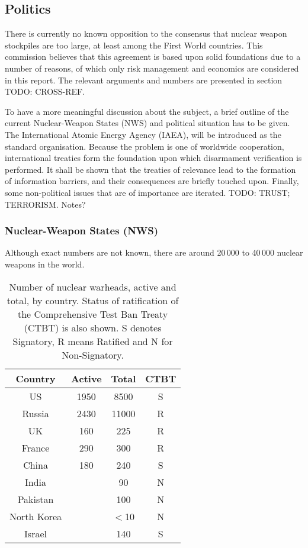 \documentclass[twoside,titlepage,11pt,twocolumn,a4paper]{article}
\begin{document}
\subsection{Politics}
There is currently no known opposition to the consensus that nuclear
weapon stockpiles are too large, at least among the First World
countries. This commission believes that this agreement is based upon
solid foundations due to a number of reasons, of which only risk
management and economics are considered in this report. The relevant
arguments and numbers are presented in section TODO: CROSS-REF. 

To have a more meaningful discussion about the subject, a brief
outline of the current Nuclear-Weapon States (NWS) and political
situation has to be given. The International Atomic Energy Agency
(IAEA), will be introduced as the standard organisation. Because the
problem is one of worldwide cooperation, international treaties form
the foundation upon which disarmament verification is performed. It
shall be shown that the treaties of relevance lead to the formation of
information barriers, and their consequences are briefly touched
upon. Finally, some non-political issues that are of importance are
iterated. TODO: TRUST; TERRORISM. Notes?

\subsubsection{Nuclear-Weapon States (NWS)}
Although exact numbers are not known, there are around 20\,000 to
40\,000 nuclear weapons in the world. \citep{worldNuclearForces2011,
  norris2010}

\begin{table}
  \begin{tabular}{|c|c|c|c|}
    \hline
    Country	& Active& Total		& CTBT	\\
    \hline
    US		& 1950 	& 8500		& S	\\
    Russia	& 2430 	& 11000		& R	\\
    UK		& 160 	& 225		& R	\\
    France	& 290	& 300		& R	\\
    China	& 180	& 240		& S	\\
    India	&	& 90		& N	\\
    Pakistan	&	& 100		& N	\\
    North Korea	&	& \(<\)10	& N	\\
    Israel	&	& 140		& S	\\
    \hline
  \end{tabular}
  \caption{Number of nuclear warheads, active and total, by
    country. Status of ratification of the Comprehensive Test Ban
    Treaty (CTBT) is also shown. S denotes Signatory, R means Ratified
    and N for Non-Signatory. \citep{worldNuclearForces2011}}
  \label{tab:NWSwarheadsCTBT}
\end{table}
\end{document}
